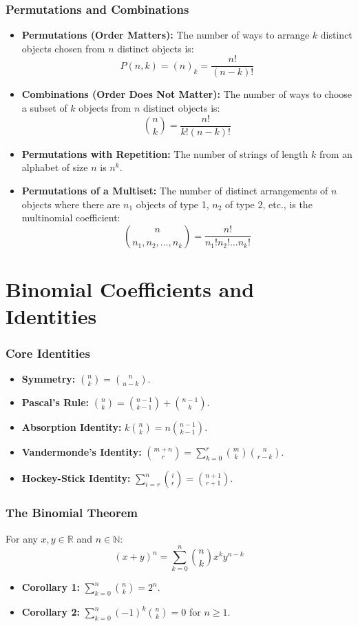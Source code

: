 \documentclass[11pt]{article}
\begin{document}
\section{Permutations and Combinations}
\begin{itemize}
    \item \textbf{Permutations (Order Matters):} The number of ways to arrange \(k\) distinct objects chosen from \(n\) distinct objects is:
    \[
 P(n, k) = (n)_k = \frac{n!}{(n-k)!} 
\]
    \item \textbf{Combinations (Order Does Not Matter):} The number of ways to choose a subset of \(k\) objects from \(n\) distinct objects is:
    \[
 \binom{n}{k} = \frac{n!}{k!(n-k)!} 
\]
    \item \textbf{Permutations with Repetition:} The number of strings of length \(k\) from an alphabet of size \(n\) is \(n^k\).
    \item \textbf{Permutations of a Multiset:} The number of distinct arrangements of \(n\) objects where there are \(n_1\) objects of type 1, \(n_2\) of type 2, etc., is the multinomial coefficient:
    \[
 \binom{n}{n_1, n_2, \dots, n_k} = \frac{n!}{n_1! n_2! \dots n_k!} 
\]
\end{itemize}

\hrulefill

\part{Binomial Coefficients and Identities}

\section{Core Identities}
\begin{itemize}
    \item \textbf{Symmetry:} \(\binom{n}{k} = \binom{n}{n-k}\).
    \item \textbf{Pascal's Rule:} \(\binom{n}{k} = \binom{n-1}{k-1} + \binom{n-1}{k}\).
    \item \textbf{Absorption Identity:} \(k\binom{n}{k} = n\binom{n-1}{k-1}\).
    \item \textbf{Vandermonde's Identity:} \(\binom{m+n}{r} = \sum_{k=0}^r \binom{m}{k}\binom{n}{r-k}\).
    \item \textbf{Hockey-Stick Identity:} \(\sum_{i=r}^n \binom{i}{r} = \binom{n+1}{r+1}\).
\end{itemize}

\section{The Binomial Theorem}
For any \(x, y \in \mathbb{R}\) and \(n \in \mathbb{N}\):
\[
 (x + y)^n = \sum_{k=0}^n \binom{n}{k} x^k y^{n-k} 
\]
\begin{itemize}
    \item \textbf{Corollary 1:} \(\sum_{k=0}^n \binom{n}{k} = 2^n\).
    \item \textbf{Corollary 2:} \(\sum_{k=0}^n (-1)^k \binom{n}{k} = 0\) for \(n \ge 1\).
\end{itemize}
\end{document}
